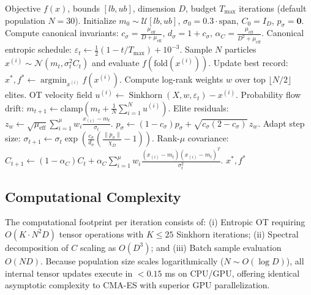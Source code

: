 \documentclass[10pt,journal,compsoc]{IEEEtran}
\begin{document}
\begin{algorithm}[t]
\caption{FlowOpt: First-Principles Riemannian Flow Matching}
\begin{algorithmic}[1]
\REQUIRE Objective $f(x)$, bounds $[lb, ub]$, dimension $D$, budget $T_{\max}$ iterations (default population $N = 30$).
\STATE Initialize $m_0 \sim \mathcal{U}[lb, ub]$, $\sigma_0 = 0.3 \cdot \text{span}$, $C_0 = I_D$, $p_\sigma = \mathbf{0}$.
\STATE Compute canonical invariants: $c_\sigma = \frac{\mu_{\text{eff}}}{D+\mu_{\text{eff}}}$, $d_\sigma = 1+c_\sigma$, $\alpha_C = \frac{\mu_{\text{eff}}}{D^2+\mu_{\text{eff}}}$.
    \STATE Canonical entropic schedule: $\varepsilon_t \leftarrow \frac{1}{2}(1 - t/T_{\max}) + 10^{-3}$.
    \STATE Sample $N$ particles $x^{(i)} \sim \mathcal{N}(m_t, \sigma_t^2 C_t)$ and evaluate $f(\text{fold}(x^{(i)}))$.
    \STATE Update best record: $x^*, f^* \leftarrow \operatorname{argmin}_{x^{(i)}} f(x^{(i)})$.
    \STATE Compute log-rank weights $w$ over top $\lfloor N/2 \rfloor$ elites.
    \STATE OT velocity field $u^{(i)} \leftarrow \operatorname{Sinkhorn}(X, w, \varepsilon_t) - x^{(i)}$.
    \STATE Probability flow drift: $m_{t+1} \leftarrow \text{clamp}\left(m_t + \frac{1}{N}\sum_{i=1}^N u^{(i)}\right)$.
    \STATE Elite residuals: $z_w \leftarrow \sqrt{\mu_{\text{eff}}} \sum_{i=1}^\mu w_i \frac{x_{(i)} - m_t}{\sigma_t}$.
    \STATE $p_\sigma \leftarrow (1 - c_\sigma) p_\sigma + \sqrt{c_\sigma (2 - c_\sigma)}\, z_w$.
    \STATE Adapt step size: $\sigma_{t+1} \leftarrow \sigma_t \exp\left(\frac{c_\sigma}{d_\sigma}\left(\frac{\|p_\sigma\|}{\chi_D} - 1\right)\right)$.
    \STATE Rank-$\mu$ covariance: $C_{t+1} \leftarrow (1-\alpha_C)C_t + \alpha_C \sum_{i=1}^\mu w_i \frac{(x_{(i)}-m_t)(x_{(i)}-m_t)^T}{\sigma_t^2}$.
\ENDWHILE
\RETURN $x^*, f^*$
\end{algorithmic}
\end{algorithm}

\subsection{Computational Complexity}
The computational footprint per iteration consists of: (i) Entropic OT requiring $O(K \cdot N^2 D)$ tensor operations with $K \le 25$ Sinkhorn iterations; (ii) Spectral decomposition of $C$ scaling as $O(D^3)$; and (iii) Batch sample evaluation $O(N D)$. Because population size scales logarithmically ($N \sim O(\log D)$), all internal tensor updates execute in $<0.15$ ms on CPU/GPU, offering identical asymptotic complexity to CMA-ES with superior GPU parallelization.
\end{document}
